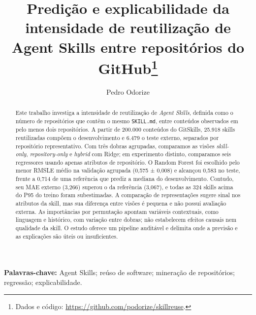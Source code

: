\documentclass[12pt]{article}
\title{Predição e explicabilidade da intensidade de reutilização de Agent Skills entre repositórios do GitHub\footnote{Dados e código: \protect\url{https://github.com/podorize/skillreuse}.}}
\author{Pedro Odorize\inst{1}}
\begin{document}
\maketitle
\begin{abstract}


Este trabalho investiga a intensidade de reutilização de \emph{Agent
Skills}, definida como o número de repositórios que contêm o mesmo
\texttt{SKILL.md}, entre conteúdos observados em pelo menos dois
repositórios. A partir de 200.000 conteúdos do GitSkills, 25.918 skills
reutilizadas compõem o desenvolvimento e 6.479 o teste externo,
separados por repositório representativo. Com três dobras agrupadas,
comparamos as visões \emph{skill-only}, \emph{repository-only} e
\emph{hybrid} com Ridge; em experimento distinto, comparamos seis
regressores usando apenas atributos de repositório. O Random Forest foi
escolhido pelo menor RMSLE médio na validação agrupada (0,575 ± 0,008) e
alcançou 0,583 no teste, frente a 0,714 de uma referência que prediz a
mediana do desenvolvimento. Contudo, seu MAE externo (3,266) superou o
da referência (3,067), e todas as 324 skills acima do P95 do treino
foram subestimadas. A comparação de representações sugere sinal nos
atributos da skill, mas sua diferença entre visões é pequena e não
possui avaliação externa. As importâncias por permutação apontam
variáveis contextuais, como linguagem e histórico, com variação entre
dobras; não estabelecem efeitos causais nem qualidade da skill. O estudo
oferece um pipeline auditável e delimita onde a previsão e as
explicações são úteis ou insuficientes.

\end{abstract}

\noindent\textbf{Palavras-chave:} Agent Skills; reúso de software; mineração de repositórios; regressão; explicabilidade.

















\appendix




\end{document}
